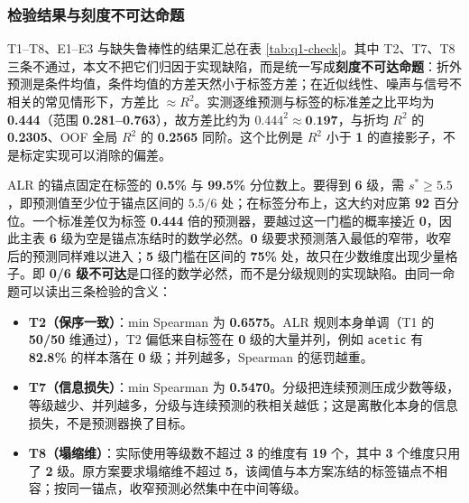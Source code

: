 \subsubsection{检验结果与刻度不可达命题}
\label{sec:q1-check}

T1--T8、E1--E3 与缺失鲁棒性的结果汇总在表 \ref{tab:q1-check}。其中 T2、T7、T8 三条不通过，本文不把它们归因于实现缺陷，而是统一写成\textbf{刻度不可达命题}：折外预测是条件均值，条件均值的方差天然小于标签方差；在近似线性、噪声与信号不相关的常见情形下，方差比 $\approx R^2$。实测逐维预测与标签的标准差之比平均为 \textbf{0.444}（范围 \textbf{0.281--0.763}），故方差比约为 $0.444^2\approx\textbf{0.197}$，与折均 $R^2$ 的 \textbf{0.2305}、OOF 全局 $R^2$ 的 \textbf{0.2565} 同阶。这个比例是 $R^2$ 小于 \textbf{1} 的直接影子，不是标定实现可以消除的偏差。

ALR 的锚点固定在标签的 \textbf{0.5\%} 与 \textbf{99.5\%} 分位数上。要得到 \textbf{6} 级，需 $s^{\ast}\ge 5.5$，即预测值至少位于锚点区间的 $5.5/6$ 处；在标签分布上，这大约对应第 \textbf{92} 百分位。一个标准差仅为标签 \textbf{0.444} 倍的预测器，要越过这一门槛的概率接近 \textbf{0}，因此主表 \textbf{6} 级为空是锚点冻结时的数学必然。\textbf{0} 级要求预测落入最低的窄带，收窄后的预测同样难以进入；\textbf{5} 级门槛在区间的 \textbf{75\%} 处，故只在少数维度出现少量格子。即 \textbf{0/6 级不可达}是口径的数学必然，而不是分级规则的实现缺陷。由同一命题可以读出三条检验的含义：

\begin{itemize}
\item \textbf{T2（保序一致）}：min Spearman 为 \textbf{0.6575}。ALR 规则本身单调（T1 的 \textbf{50/50} 维通过），T2 偏低来自标签在 \textbf{0} 级的大量并列，例如 \texttt{acetic} 有 \textbf{82.8\%} 的样本落在 \textbf{0} 级；并列越多，Spearman 的惩罚越重。
\item \textbf{T7（信息损失）}：min Spearman 为 \textbf{0.5470}。分级把连续预测压成少数等级，等级越少、并列越多，分级与连续预测的秩相关越低；这是离散化本身的信息损失，不是预测器换了目标。
\item \textbf{T8（塌缩维）}：实际使用等级数不超过 \textbf{3} 的维度有 \textbf{19} 个，其中 \textbf{3} 个维度只用了 \textbf{2} 级。原方案要求塌缩维不超过 \textbf{5}，该阈值与本方案冻结的标签锚点不相容；按同一锚点，收窄预测必然集中在中间等级。
\end{itemize}

